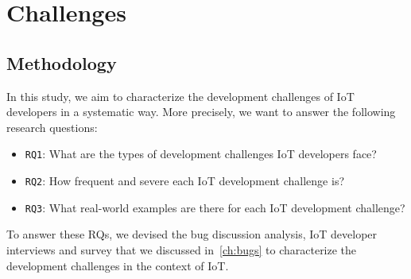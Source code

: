  
\chapter{Challenges}
\label{ch:Challenges}

\section{Methodology}
In this study, we aim to characterize the development challenges of IoT developers in a systematic way. More precisely, we want to answer the following research questions:
\begin{itemize}
\item {\verb|RQ1|}: What are the types of development challenges IoT developers face?
\item {\verb|RQ2|}: How frequent and severe each IoT development challenge is?
\item {\verb|RQ3|}: What real-world examples are there for each IoT development challenge?
\end{itemize}
To answer these RQs, we devised the bug discussion analysis, IoT developer interviews and survey that we discussed in~\autoref{ch:bugs} to characterize the development challenges in the context of IoT. 

